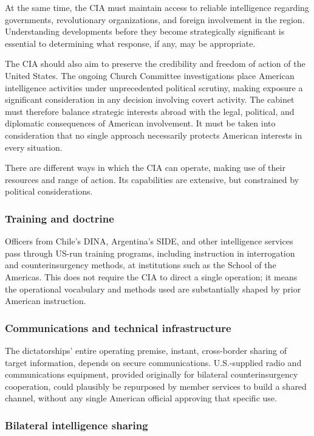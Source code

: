 At the same time, the CIA must maintain access to reliable intelligence regarding governments, revolutionary organizations, and foreign involvement in the region. Understanding developments before they become strategically significant is essential to determining what response, if any, may be appropriate.

The CIA should also aim to preserve the credibility and freedom of action of the United States. The ongoing Church Committee investigations place American intelligence activities under unprecedented political scrutiny, making exposure a significant consideration in any decision involving covert activity. The cabinet must therefore balance strategic interests abroad with the legal, political, and diplomatic consequences of American involvement. It must be taken into consideration that no single approach necessarily protects American interests in every situation.

There are different ways in which the CIA can operate, making use of their resources and range of action. Its capabilities are extensive, but constrained by political considerations.

\subsubsection{Training and doctrine}

Officers from Chile's DINA, Argentina's SIDE, and other intelligence services pass through US-run training programs, including instruction in interrogation and counterinsurgency methods, at institutions such as the School of the Americas. This does not require the CIA to direct a single operation; it means the operational vocabulary and methods used are substantially shaped by prior American instruction.

\subsubsection{Communications and technical infrastructure}

The dictatorships’ entire operating premise, instant, cross-border sharing of target information, depends on secure communications. U.S.-supplied radio and communications equipment, provided originally for bilateral counterinsurgency cooperation, could plausibly be repurposed by member services to build a shared channel, without any single American official approving that specific use.

\subsubsection{Bilateral intelligence sharing}

